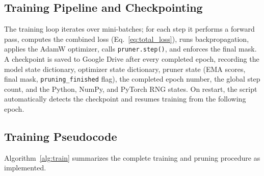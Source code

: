 \documentclass[conference]{IEEEtran}
\begin{document}
\subsection{Training Pipeline and Checkpointing}

The training loop iterates over mini-batches; for each step
it performs a forward pass, computes the combined loss
(Eq.~\eqref{eq:total_loss}), runs backpropagation, applies
the AdamW optimizer, calls \texttt{pruner.step()}, and
enforces the final mask. A checkpoint is saved to
Google Drive after every completed epoch, recording the
model state dictionary, optimizer state dictionary, pruner
state (EMA scores, final mask, \texttt{pruning\_finished}
flag), the completed epoch number, the global step count,
and the Python, NumPy, and PyTorch RNG states. On restart,
the script automatically detects the checkpoint and resumes
training from the following epoch.

\subsection{Training Pseudocode}

Algorithm~\ref{alg:train} summarizes the complete training
and pruning procedure as implemented.
\end{document}
